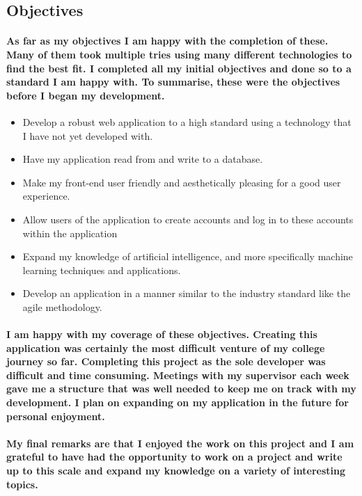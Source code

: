 \subsection{Objectives}
\paragraph{As far as my objectives I am happy with the completion of these. Many of them took multiple tries using many different technologies to find the best fit. I completed all my initial objectives and done so to a standard I am happy with. To summarise, these were the objectives before I began my development.}

\begin{itemize}
    \item Develop a robust web application to a high standard using a technology that I have not yet developed with.
    \item Have my application read from and write to a database.
    \item Make my front-end user friendly and aesthetically pleasing for a good user experience.
    \item Allow users of the application to create accounts and log in to these accounts within the application
    \item Expand my knowledge of artificial intelligence, and more specifically machine learning techniques and applications.
    \item Develop an application in a manner similar to the industry standard like the agile methodology.
\end{itemize}

\paragraph{I am happy with my coverage of these objectives. Creating this application was certainly the most difficult venture of my college journey so far. Completing this project as the sole developer was difficult and time consuming. Meetings with my supervisor each week gave me a structure that was well needed to keep me on track with my development. I plan on expanding on my application in the future for personal enjoyment.}

\paragraph{My final remarks are that I enjoyed the work on this project and I am grateful to have had the opportunity to work on a project and write up to this scale and expand my knowledge on a variety of interesting topics.}